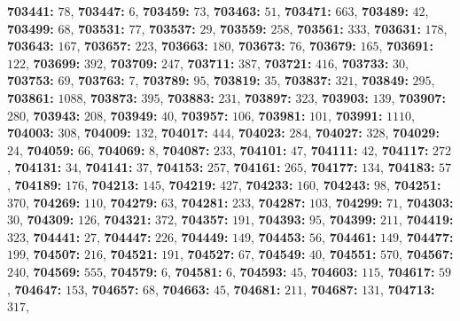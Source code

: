 \textsf{\bfseries 703441:} $78$, \textsf{\bfseries 703447:} $6$, \textsf{\bfseries 703459:} $73$, \textsf{\bfseries 703463:} $51$, \textsf{\bfseries 703471:} $663$, \textsf{\bfseries 703489:} $42$, \textsf{\bfseries 703499:} $68$, \textsf{\bfseries 703531:} $77$, \textsf{\bfseries 703537:} $29$, \textsf{\bfseries 703559:} $258$, \textsf{\bfseries 703561:} $333$, \textsf{\bfseries 703631:} $178$, \textsf{\bfseries 703643:} $167$, \textsf{\bfseries 703657:} $223$, \textsf{\bfseries 703663:} $180$, \textsf{\bfseries 703673:} $76$, \textsf{\bfseries 703679:} $165$, \textsf{\bfseries 703691:} $122$, \textsf{\bfseries 703699:} $392$, \textsf{\bfseries 703709:} $247$, \textsf{\bfseries 703711:} $387$, \textsf{\bfseries 703721:} $416$, \textsf{\bfseries 703733:} $30$, \textsf{\bfseries 703753:} $69$, \textsf{\bfseries 703763:} $7$, \textsf{\bfseries 703789:} $95$, \textsf{\bfseries 703819:} $35$, \textsf{\bfseries 703837:} $321$, \textsf{\bfseries 703849:} $295$, \textsf{\bfseries 703861:} $1088$, \textsf{\bfseries 703873:} $395$, \textsf{\bfseries 703883:} $231$, \textsf{\bfseries 703897:} $323$, \textsf{\bfseries 703903:} $139$, \textsf{\bfseries 703907:} $280$, \textsf{\bfseries 703943:} $208$, \textsf{\bfseries 703949:} $40$, \textsf{\bfseries 703957:} $106$, \textsf{\bfseries 703981:} $101$, \textsf{\bfseries 703991:} $1110$, \textsf{\bfseries 704003:} $308$, \textsf{\bfseries 704009:} $132$, \textsf{\bfseries 704017:} $444$, \textsf{\bfseries 704023:} $284$, \textsf{\bfseries 704027:} $328$, \textsf{\bfseries 704029:} $24$, \textsf{\bfseries 704059:} $66$, \textsf{\bfseries 704069:} $8$, \textsf{\bfseries 704087:} $233$, \textsf{\bfseries 704101:} $47$, \textsf{\bfseries 704111:} $42$, \textsf{\bfseries 704117:} $272$, \textsf{\bfseries 704131:} $34$, \textsf{\bfseries 704141:} $37$, \textsf{\bfseries 704153:} $257$, \textsf{\bfseries 704161:} $265$, \textsf{\bfseries 704177:} $134$, \textsf{\bfseries 704183:} $57$, \textsf{\bfseries 704189:} $176$, \textsf{\bfseries 704213:} $145$, \textsf{\bfseries 704219:} $427$, \textsf{\bfseries 704233:} $160$, \textsf{\bfseries 704243:} $98$, \textsf{\bfseries 704251:} $370$, \textsf{\bfseries 704269:} $110$, \textsf{\bfseries 704279:} $63$, \textsf{\bfseries 704281:} $233$, \textsf{\bfseries 704287:} $103$, \textsf{\bfseries 704299:} $71$, \textsf{\bfseries 704303:} $30$, \textsf{\bfseries 704309:} $126$, \textsf{\bfseries 704321:} $372$, \textsf{\bfseries 704357:} $191$, \textsf{\bfseries 704393:} $95$, \textsf{\bfseries 704399:} $211$, \textsf{\bfseries 704419:} $323$, \textsf{\bfseries 704441:} $27$, \textsf{\bfseries 704447:} $226$, \textsf{\bfseries 704449:} $149$, \textsf{\bfseries 704453:} $56$, \textsf{\bfseries 704461:} $149$, \textsf{\bfseries 704477:} $199$, \textsf{\bfseries 704507:} $216$, \textsf{\bfseries 704521:} $191$, \textsf{\bfseries 704527:} $67$, \textsf{\bfseries 704549:} $40$, \textsf{\bfseries 704551:} $570$, \textsf{\bfseries 704567:} $240$, \textsf{\bfseries 704569:} $555$, \textsf{\bfseries 704579:} $6$, \textsf{\bfseries 704581:} $6$, \textsf{\bfseries 704593:} $45$, \textsf{\bfseries 704603:} $115$, \textsf{\bfseries 704617:} $59$, \textsf{\bfseries 704647:} $153$, \textsf{\bfseries 704657:} $68$, \textsf{\bfseries 704663:} $45$, \textsf{\bfseries 704681:} $211$, \textsf{\bfseries 704687:} $131$, \textsf{\bfseries 704713:} $317$, 
